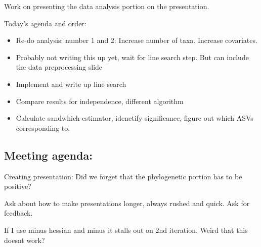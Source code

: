 \documentclass[10pt]{article}
\theoremstyle{definition}
\begin{document}
Work on presenting the data analysis portion on the presentation.

Today's agenda and order:
\begin{itemize}
  \item Re-do analysis: number 1 and 2: Increase number of taxa. Increase covariates.
  \item Probably not writing this up yet, wait for line search step. But can include the data preprocessing slide
  \item Implement and write up line search
  \item Compare results for independence, different algorithm
  \item Calculate sandwhich estimator, idenetify significance, figure out which ASVs corresponding to.
\end{itemize}


\subsection{Meeting agenda:}
Creating presentation: Did we forget that the phylogenetic portion has to be positive?

Ask about how to make presentations longer, always rushed and quick. Ask for feedback.

If I use minus hessian and minus it stalls out on 2nd iteration. Weird that this doesnt work?
\end{document}

